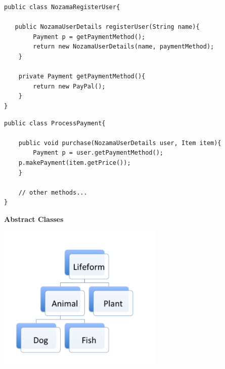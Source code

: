 \documentclass{beamer}
\begin{document}
\begin{frame}[fragile]
\begin{block}{}
\begin{lstlisting}
public class NozamaRegisterUser{
    
   public NozamaUserDetails registerUser(String name){
        Payment p = getPaymentMethod();
        return new NozamaUserDetails(name, paymentMethod);
    }
    
    private Payment getPaymentMethod(){
    	return new PayPal();
    }
}
\end{lstlisting}
\end{block}
\end{frame}

\begin{frame}[fragile]
\begin{block}{}
\begin{lstlisting}
public class ProcessPayment{
       
    public void purchase(NozamaUserDetails user, Item item){
    	Payment p = user.getPaymentMethod();
	p.makePayment(item.getPrice());
    }
    
    // other methods...
}
\end{lstlisting}
\end{block}
\end{frame}

\begin{frame}
\begin{center}
\textbf{Abstract Classes}
\end{center}
\end{frame}

\begin{frame}
\begin{center}
\includegraphics[height=7cm, keepaspectratio]{images/inheritance5}
\end{center}
\end{frame}
\end{document}
